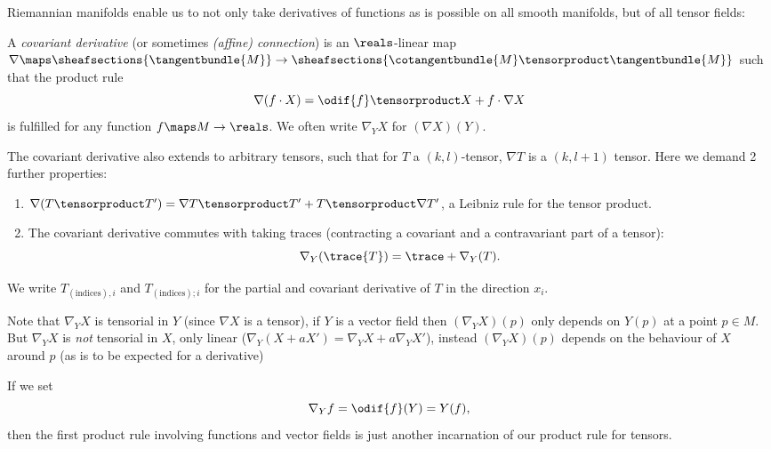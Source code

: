 \documentclass[titlepage,numbers=noenddot,oneside,%
cleardoublepage=empty,paper=a4,fontsize=11pt,%
english,%
]{scrartcl}
\begin{document}
Riemannian manifolds enable us to not only take derivatives of functions as is possible on all smooth manifolds, but of all tensor fields:
\begin{definition}
    A \emph{covariant derivative} (or sometimes \emph{(affine) connection}) is an \( \reals \)-linear map \( \nabla\maps \sheafsections{\tangentbundle{M}}\to \sheafsections{\cotangentbundle{M}\tensorproduct \tangentbundle{M}} \) such that the product rule
    \begin{equation*}
        \nabla(f\cdot X)=\odif{f}\tensorproduct X+f\cdot \nabla X
    \end{equation*}
    is fulfilled for any function \( f \maps M\to \reals\). We often write \( \nabla_Y X \) for \( (\nabla X)(Y) \).

    The covariant derivative also extends to arbitrary tensors, such that for \( T \) a \( (k,l) \)-tensor, \( \nabla T \) is a \( (k,l+1) \) tensor. Here we demand 2 further properties:
    \begin{enumerate}
        \item \( \nabla(T\tensorproduct T')=\nabla T\tensorproduct T'+T\tensorproduct \nabla T' \), \ie a Leibniz rule for the tensor product.
        \item The covariant derivative commutes with taking traces (contracting a covariant and a contravariant part of a tensor):
        \begin{equation*}
            \nabla_Y (\trace{T})=\trace+{\nabla_Y(T)}.
        \end{equation*}
    \end{enumerate}
\end{definition}
\begin{notation}  \label{notation:derivative_indices}  
    We write \( T_{(\text{indices}),i} \) and \( T_{(\text{indices});i} \) for the partial and covariant derivative of \( T \) in the direction \( x_i \).
\end{notation}
\begin{remark}
    Note that \( \nabla_Y X \) is tensorial in \( Y \) (since \( \nabla X \) is a tensor), \ie if \( Y  \) is a vector field then \( (\nabla_Y X)(p) \) only depends on \( Y(p) \) at a point \( p\in M \). But \( \nabla_Y X \) is \emph{not} tensorial in \( X \), only linear (\ie \( \nabla_Y (X+aX')=\nabla_Y X+ a\nabla_Y X' \)), instead \( (\nabla_Y X)(p) \) depends on the behaviour of \( X \) around \( p \) (as is to be expected for a derivative)
\end{remark}
\begin{remark}
    If we set
    \begin{equation*}
        \nabla_Y f =\odif{f}(Y)=Y(f),
    \end{equation*}
    then the first product rule involving functions and vector fields is just another incarnation of our product rule for tensors.
\end{remark}
\end{document}
